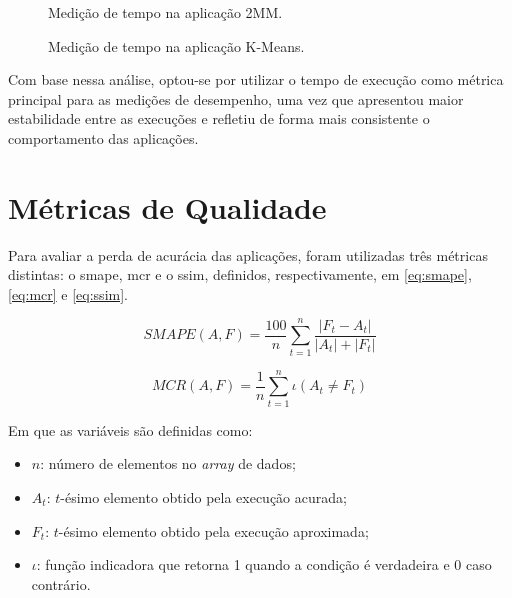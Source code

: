 \begin{figure}[htbp]
	\caption{Medição de tempo na aplicação 2MM.}
	\centering
	\hfill
	\fonte{}
	\label{fig:2mm_time}
\end{figure}

\begin{figure}[htbp]
	\caption{Medição de tempo na aplicação K-Means.}
	\centering
	\hfill
	\fonte{}
	\label{fig:kmeans_time}
\end{figure}

Com base nessa análise, optou-se por utilizar o tempo de execução como métrica principal para as medições de desempenho, uma vez que apresentou maior estabilidade entre as execuções e refletiu de forma mais consistente o comportamento das aplicações.

\section{Métricas de Qualidade}\label{sec:qualidade}

Para avaliar a perda de acurácia das aplicações, foram utilizadas três métricas distintas: o \gls{smape}, \gls{mcr} e o \gls{ssim}, definidos, respectivamente, em \autoref{eq:smape}, \autoref{eq:mcr} e \autoref{eq:ssim}.

\begin{equation}
	SMAPE(A, F) = \frac{100}{n} \sum^{n}_{t=1}\frac{|F_t - A_t|}{|A_t| + |F_t|}
	\label{eq:smape}
\end{equation}

\begin{equation}
	MCR(A, F) = \frac{1}{n} \sum^{n}_{t=1} \iota (A_t \neq F_t)
	\label{eq:mcr}
\end{equation}

Em que as variáveis são definidas como:
\begin{itemize}
	\item $n$: número de elementos no \textit{array} de dados;
	\item $A_t$: $t$-ésimo elemento obtido pela execução acurada;
	\item $F_t$: $t$-ésimo elemento obtido pela execução aproximada;
	\item $\iota$: função indicadora que retorna 1 quando a condição é verdadeira e 0 caso contrário.
\end{itemize}

